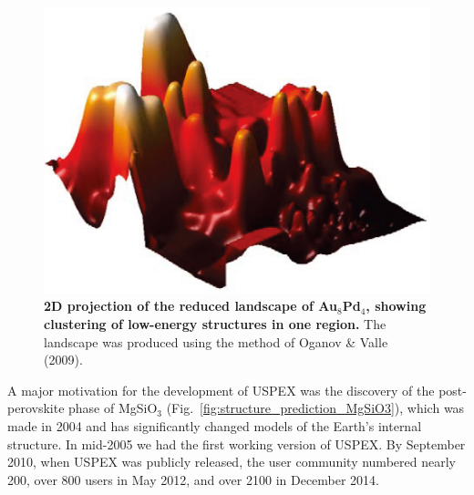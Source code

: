 \documentclass[12pt]{article}
\begin{document}
\begin{figure}[htbp] \centering
\includegraphics[scale=0.3]{pic/energy_landscape.png} \caption{\footnotesize
\textbf{2D projection of the reduced landscape of Au$_8$Pd$_4$, showing
clustering of low-energy structures in one region.} The landscape was produced
using the method of Oganov \& Valle (2009).}
\label{fig:energy_landscape}
\end{figure}

A major motivation for the development of USPEX was the discovery of the
post-perovskite phase of MgSiO$_3$ (Fig.~\ref{fig:structure_prediction_MgSiO3}),
which was made in 2004 \cite{Oganov2004, Murakami2004} and has significantly
changed models of the Earth's internal structure. In mid-2005 we had the first
working version of USPEX. By September 2010, when USPEX was publicly released,
the user community numbered nearly 200, over 800 users in May 2012, and over
2100 in December 2014.
\end{document}
